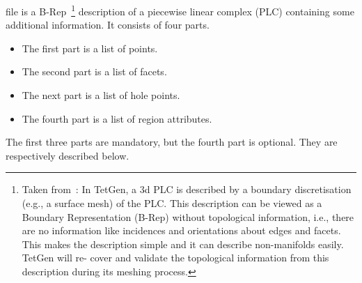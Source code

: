 \documentclass[12pt,twoside,a4paper]{article}
\numberwithin{equation}{section}
\begin{document}
file is a B-Rep~\footnote{Taken from~\cite[p. 51]{Si2013}: In TetGen, a 3d
  PLC is described by a boundary discretisation (e.g., a surface mesh) of
  the PLC. This description can be viewed as a Boundary Representation
  (B-Rep) without topological information, i.e., there are no information
  like incidences and orientations about edges and facets. This makes the
  description simple and it can describe non-manifolds easily. TetGen will
  re- cover and validate the topological information from this description
  during its meshing process.} description of a piecewise linear complex
(PLC) containing some additional information. It consists of four parts.
\begin{itemize}
  \item The first part is a list of points.
  \item The second part is a list of facets.
  \item The next part is a list of hole points.
  \item The fourth part is a list of region attributes.
\end{itemize}
The first three parts are mandatory, but the fourth part is optional. They
are respectively described below.
\newcommand{\cubepolyfile}{./../tetgen_files_unit_cube/cube.poly}
\end{document}

